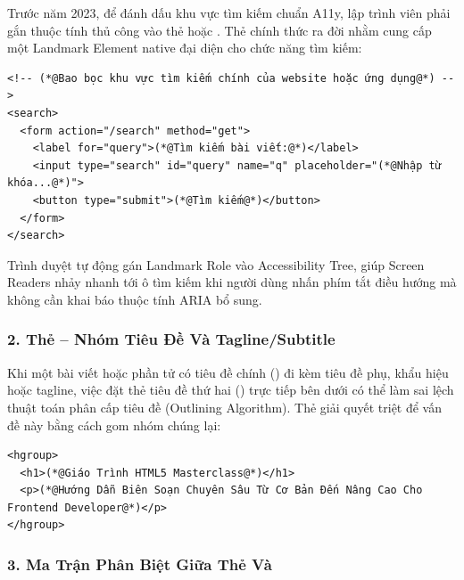 Trước năm 2023, để đánh dấu khu vực tìm kiếm chuẩn A11y, lập trình viên phải gắn thuộc tính  thủ công vào thẻ  hoặc . Thẻ  chính thức ra đời nhằm cung cấp một Landmark Element native đại diện cho chức năng tìm kiếm:

\begin{codeWindow}
\begin{lstlisting}[language=HTML5]
<!-- (*@Bao bọc khu vực tìm kiếm chính của website hoặc ứng dụng@*) -->
<search>
  <form action="/search" method="get">
    <label for="query">(*@Tìm kiếm bài viết:@*)</label>
    <input type="search" id="query" name="q" placeholder="(*@Nhập từ khóa...@*)">
    <button type="submit">(*@Tìm kiếm@*)</button>
  </form>
</search>
\end{lstlisting}
\end{codeWindow}

\begin{noteBox}
Trình duyệt tự động gán Landmark Role  vào Accessibility Tree, giúp Screen Readers nhảy nhanh tới ô tìm kiếm khi người dùng nhấn phím tắt điều hướng mà không cần khai báo thuộc tính ARIA bổ sung.
\end{noteBox}

\subsubsection{2. Thẻ  -- Nhóm Tiêu Đề Và Tagline/Subtitle}

Khi một bài viết hoặc phần tử có tiêu đề chính () đi kèm tiêu đề phụ, khẩu hiệu hoặc tagline, việc đặt thẻ tiêu đề thứ hai () trực tiếp bên dưới có thể làm sai lệch thuật toán phân cấp tiêu đề (Outlining Algorithm). Thẻ  giải quyết triệt để vấn đề này bằng cách gom nhóm chúng lại:

\begin{codeWindow}
\begin{lstlisting}[language=HTML5]
<hgroup>
  <h1>(*@Giáo Trình HTML5 Masterclass@*)</h1>
  <p>(*@Hướng Dẫn Biên Soạn Chuyên Sâu Từ Cơ Bản Đến Nâng Cao Cho Frontend Developer@*)</p>
</hgroup>
\end{lstlisting}
\end{codeWindow}

\subsubsection{3. Ma Trận Phân Biệt Giữa Thẻ  Và }

